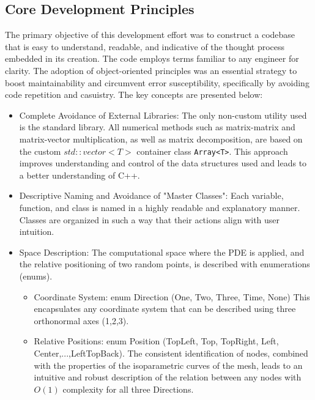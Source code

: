 \documentclass{article}
\begin{document}
	\subsection{Core Development Principles}
	The primary objective of this development effort was to construct a codebase that is easy to understand, readable, and indicative of the thought process embedded in its creation. The code employs terms familiar to any engineer for clarity. The adoption of object-oriented principles was an essential strategy to boost maintainability and circumvent error susceptibility, specifically by avoiding code repetition and casuistry. The key concepts are presented below:
	
	
	\begin{itemize}
		
		\item Complete Avoidance of External Libraries: The only non-custom utility used is the standard library. All numerical methods such as matrix-matrix and matrix-vector multiplication, as well as matrix decomposition, are based on the custom $std::vector<T>$ container class \texttt{Array<T>}. This approach improves understanding and control of the data structures used and leads to a better understanding of C++.
		
		\item Descriptive Naming and Avoidance of "Master Classes": Each variable, function, and class is named in a highly readable and explanatory manner. Classes are organized in such a way that their actions align with user intuition.

		
		\item Space Description: The computational space where the PDE is applied, and the relative positioning of two random points, is described with enumerations (enums).
		
		\begin{itemize}
			\item Coordinate System: enum Direction (One, Two, Three, Time, None) \newline
			This encapsulates any coordinate system that can be described using three orthonormal axes (1,2,3).
			
			\item Relative Positions: enum Position (TopLeft, Top, TopRight, Left, Center,...,LeftTopBack). \newline
			The consistent identification of nodes, combined with the properties of the isoparametric curves of the mesh, leads to an intuitive and robust description of the relation between any nodes with $O(1)$ complexity for all three Directions.
			

\end{itemize}
\end{itemize}
\end{document}
